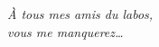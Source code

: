 \vspace*{1in}
\begin{flushright}
  \itshape
  À tous mes amis du labos,\\
  vous me manquerez\ldots
\end{flushright}
